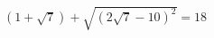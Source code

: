 \begin{ex}[type=chek_eq]
	\begin{condition}
		\( (1+\sqrt{7})+\sqrt{(2\sqrt{7}-10)^2}=18 \)
	\end{condition}
\end{ex}
